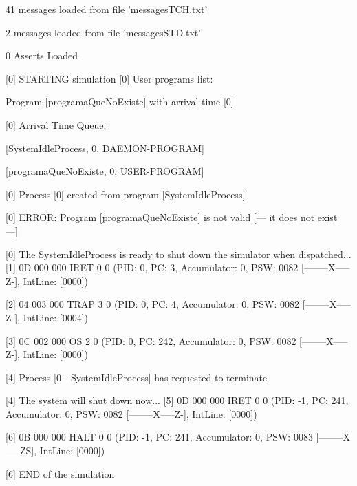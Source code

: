 41 messages loaded from file 'messagesTCH.txt'

2 messages loaded from file 'messagesSTD.txt'

0 Asserts Loaded

[\textcolor{termred}{0}] 
\textcolor{termred}{STARTING simulation
}
[\textcolor{termred}{0}] 
User programs list:

	Program [\textcolor{termcyan}{programaQueNoExiste}] with arrival time [\textcolor{termcyan}{0}]
	
[\textcolor{termred}{0}] 
Arrival Time Queue:

		[\textcolor{termgreen}{SystemIdleProcess}, \textcolor{termred}{0}, \textcolor{termgreen}{DAEMON-PROGRAM}]

		[\textcolor{termgreen}{programaQueNoExiste}, \textcolor{termred}{0}, \textcolor{termgreen}{USER-PROGRAM}]

	
[\textcolor{termred}{0}] 
\textcolor{termgreen}{Process [0] created from program [SystemIdleProcess]}

	
[\textcolor{termred}{0}] 
\textcolor{termred}{ERROR: Program [programaQueNoExiste] is not valid [--- it does not exist ---]}

[\textcolor{termred}{0}] 
\textcolor{termred}{The SystemIdleProcess is ready to shut down the simulator when dispatched...
}
[\textcolor{termred}{1}] 
{0D 000 000}
 IRET 0 0 (PID: \textcolor{termgreen}{0}, PC: \textcolor{termred}{3}, Accumulator: \textcolor{termred}{0}, PSW: \textcolor{termred}{0082} [\textcolor{termred}{--------X-----Z-}], IntLine: [\textcolor{termred}{0000}])

[\textcolor{termred}{2}] 
{04 003 000}
 TRAP 3 0 (PID: \textcolor{termgreen}{0}, PC: \textcolor{termred}{4}, Accumulator: \textcolor{termred}{0}, PSW: \textcolor{termred}{0082} [\textcolor{termred}{--------X-----Z-}], IntLine: [\textcolor{termred}{0004}])

[\textcolor{termred}{3}] 
{0C 002 000}
 OS 2 0 (PID: \textcolor{termgreen}{0}, PC: \textcolor{termred}{242}, Accumulator: \textcolor{termred}{0}, PSW: \textcolor{termred}{0082} [\textcolor{termred}{--------X-----Z-}], IntLine: [\textcolor{termred}{0000}])

	
[\textcolor{termred}{4}] 
\textcolor{termred}{Process [0 - SystemIdleProcess] has requested to terminate}

[\textcolor{termred}{4}] 
\textcolor{termred}{The system will shut down now...
}
[\textcolor{termred}{5}] 
{0D 000 000}
 IRET 0 0 (PID: \textcolor{termgreen}{-1}, PC: \textcolor{termred}{241}, Accumulator: \textcolor{termred}{0}, PSW: \textcolor{termred}{0082} [\textcolor{termred}{--------X-----Z-}], IntLine: [\textcolor{termred}{0000}])

[\textcolor{termred}{6}] 
{0B 000 000}
 HALT 0 0 (PID: \textcolor{termgreen}{-1}, PC: \textcolor{termred}{241}, Accumulator: \textcolor{termred}{0}, PSW: \textcolor{termred}{0083} [\textcolor{termred}{--------X-----ZS}], IntLine: [\textcolor{termred}{0000}])

[\textcolor{termred}{6}] 
\textcolor{termred}{END of the simulation
}
